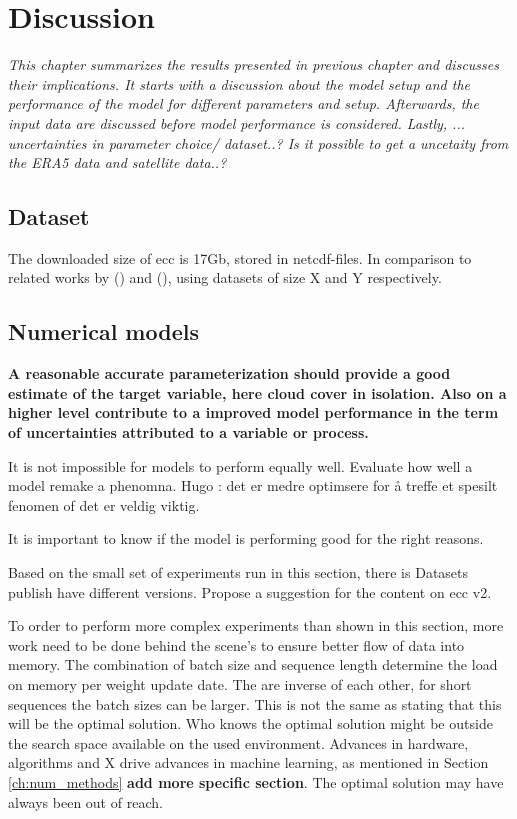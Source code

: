 \chapter{Discussion}
\textit{This chapter summarizes the results presented in previous chapter and discusses their implications. It starts with a discussion about the model setup and the performance of the model for different parameters and setup. Afterwards, the input data are discussed before model performance is considered. Lastly, ... uncertainties in parameter choice/ dataset..? Is it possible to get a uncetaity from the ERA5 data and satellite data..?} 

\section{Dataset}
The downloaded size of \acrshort{ecc} is 17Gb, stored in \acrshort{netcdf}-files. 
In comparison to related works by \citeauthor{precip_nowcasting} (\citeyear{precip_nowcasting}) and \citeauthor{SunAirLSTM} (\citeyear{SunAirLSTM}), using datasets of size X and Y respectively.


\section{Numerical models}
\textbf{A reasonable accurate parameterization should provide a good estimate of the target variable, here cloud cover in isolation. Also on a higher level contribute to a improved model performance in the term of uncertainties attributed to a variable or process.}  

It is not impossible for models to perform equally well. Evaluate how well a model remake a phenomna. Hugo : det er medre optimsere for å treffe et spesilt fenomen of det er veldig viktig. 


It is important to know if the model is performing good for the right reasons.

Based on the small set of experiments run in this section, there is 
Datasets publish have different versions. Propose a suggestion for the content on \acrshort{ecc} v2.

To order to perform more complex experiments than shown in this section, more work need to be done behind the scene's to ensure better flow of data into memory. The combination of batch size and sequence length determine the load on memory per weight update date. The are inverse of each other, for short sequences the batch sizes can be larger. This is not the same as stating that this will be the optimal solution. Who knows the optimal solution might be outside the search space available on the used environment. Advances in hardware, algorithms and X drive advances in machine learning, as mentioned in Section \ref{ch:num_methods} \textbf{add more specific section}. The optimal solution may have always been out of reach. 

